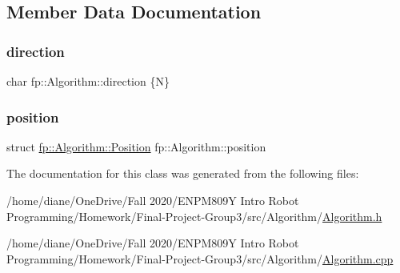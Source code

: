 \subsection{Member Data Documentation}
\mbox{\label{classfp_1_1_algorithm_afdbf632b658aea1aef75caa90e60a8fc}} 
\subsubsection{\texorpdfstring{direction}{direction}}
{\footnotesize\ttfamily char fp\+::\+Algorithm\+::direction \{\textquotesingle{}N\textquotesingle{}\}\hspace{0.3cm}{\ttfamily [protected]}}

\mbox{\label{classfp_1_1_algorithm_a841339b57c3d2739325f3f421ada43b6}} 
\subsubsection{\texorpdfstring{position}{position}}
{\footnotesize\ttfamily struct \hyperlink{structfp_1_1_algorithm_1_1_position}{fp\+::\+Algorithm\+::\+Position} fp\+::\+Algorithm\+::position}



The documentation for this class was generated from the following files\+:\begin{DoxyCompactItemize}
\item 
/home/diane/\+One\+Drive/\+Fall 2020/\+E\+N\+P\+M809\+Y Intro Robot Programming/\+Homework/\+Final-\/\+Project-\/\+Group3/src/\+Algorithm/\hyperlink{_algorithm_8h}{Algorithm.\+h}\item 
/home/diane/\+One\+Drive/\+Fall 2020/\+E\+N\+P\+M809\+Y Intro Robot Programming/\+Homework/\+Final-\/\+Project-\/\+Group3/src/\+Algorithm/\hyperlink{_algorithm_8cpp}{Algorithm.\+cpp}\end{DoxyCompactItemize}
